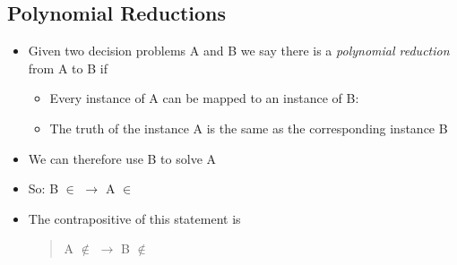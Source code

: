 \Outline %

\begin{slide}
\section[-1]{Polynomial Reductions}

\begin{PauseHighLight}
  \begin{itemize}
  \item Given two decision problems A and B we say there is a
      \emph{polynomial reduction} from A to B if\pause
    \begin{itemize}
    \item Every instance of A can be mapped to an instance of B:\pause
    \item The truth of the instance A is the same as the
      corresponding instance B\pause
    \end{itemize}
  \item We can therefore use B to solve A\pause
  \item So:  B $\in$  $\rightarrow$ A  $\in$ \pause
  \item The contrapositive of this statement is
    \begin{quote}
      A $\not\in$  $\rightarrow$ B  $\not\in$ \pause
    \end{quote}
  \end{itemize}
\end{PauseHighLight}

\end{slide}


